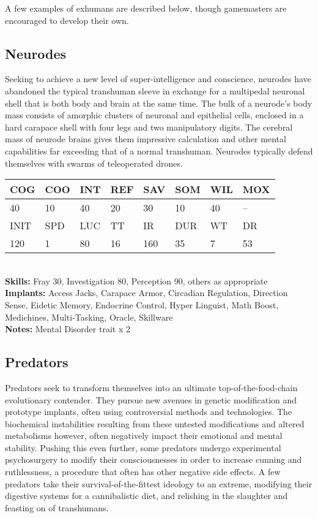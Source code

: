 A few examples of exhumans are described below, 
though gamemasters are encouraged to develop 
their own.

\subsection{Neurodes}

Seeking to achieve a new level of super-intelligence 
and conscience, neurodes have abandoned the typical
transhuman sleeve in exchange for a multipedal
neuronal shell that is both body and brain at the same 
time. The bulk of a neurode's body mass consists of 
amorphic clusters of neuronal and epithelial cells, enclosed
in a hard carapace shell with four legs and two
manipulatory digits. The cerebral mass of neurode 
brains gives them impressive calculation and other 
mental capabilities far exceeding that of a normal 
transhuman. Neurodes typically defend themselves 
with swarms of teleoperated drones.

\begin{tabular}{|l|l|l|l|l|l|l|l|}
\hline
COG & COO & INT & REF & SAV & SOM & WIL & MOX \\
\hline
40 & 10 & 40 & 20 & 30 & 10 & 40 & -- \\
\hline
INIT & SPD & LUC & TT & IR & DUR & WT & DR \\
\hline
120 & 1 & 80 & 16 & 160 & 35 & 7 & 53 \\
\hline
\end{tabular}
\\
\textbf{Skills:} Fray 30, Investigation 80, Perception 90, others as appropriate \\
\textbf{Implants:} Access Jacks, Carapace Armor, Circadian Regulation, Direction Sense, Eidetic Memory, Endocrine Control, Hyper Linguist, Math Boost, Medichines, Multi-Tasking, Oracle, Skillware \\
\textbf{Notes:} Mental Disorder trait x 2 \\

\subsection{Predators}

Predators seek to transform themselves into an ultimate
top-of-the-food-chain evolutionary contender.
They pursue new avenues in genetic modification and 
prototype implants, often using controversial methods 
and technologies. The biochemical instabilities resulting 
from these untested modifications and altered metabolisms
however, often negatively impact their emotional
and mental stability. Pushing this even further, some 
predators undergo experimental psychosurgery to 
modify their consciousnesses in order to increase cunning
and ruthlessness, a procedure that often has other
negative side effects. A few predators take their survival-of-the-fittest
ideology to an extreme, modifying their
digestive systems for a cannibalistic diet, and relishing 
in the slaughter and feasting on of transhumans.

